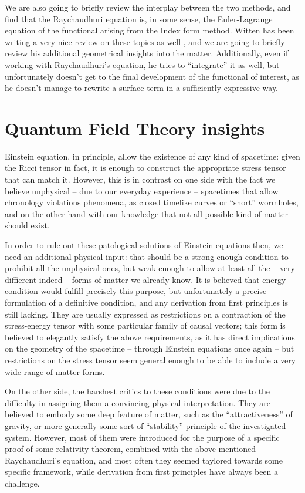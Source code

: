 We are also going to briefly review the interplay between the two methods, and find that the Raychaudhuri equation is, in some sense, the Euler-Lagrange equation of the functional arising from the Index form method. Witten has been writing a very nice review on these topics as well \cite[]{witten2020light}, and we are going to briefly review his additional geometrical insights into the matter. Additionally, even if working with Raychaudhuri's equation, he tries to ``integrate'' it as well, but unfortunately doesn't get to the final development of the functional of interest, as he doesn't manage to rewrite a surface term in a sufficiently expressive way.

\section{Quantum Field Theory insights}
Einstein equation, in principle, allow the existence of any kind of spacetime: given the Ricci tensor in fact, it is enough to construct the appropriate stress tensor that can match it. However, this is in contrast on one side with the fact we believe unphysical -- due to our everyday experience -- spacetimes that allow chronology violations phenomena, as closed timelike curves or ``short'' wormholes, and on the other hand with our knowledge that not all possible kind of matter should exist.

In order to rule out these patological solutions of Einstein equations then, we need an additional physical input: that should be a strong enough condition to prohibit all the unphysical ones, but weak enough to allow at least all the -- very diffierent indeed -- forms of matter we already know.
It is believed that energy condition would fulfill precisely this purpose, but unfortunately a precise formulation of a definitive condition, and any derivation from first principles is still lacking. They are usually expressed as restrictions on a contraction of the stress-energy tensor with some particular family of causal vectors; this form is believed to elegantly satisfy the above requirements, as it has direct implications on the geometry of the spacetime -- through Einstein equations once again -- but restrictions on the stress tensor seem general enough to be able to include a very wide range of matter forms.

On the other side, the harshest critics to these conditions were due to the difficulty in assigning them a convincing physical interpretation. They are believed to embody some deep feature of matter, such as the ``attractiveness'' of gravity, or more generally some sort of ``stability'' principle of the investigated system.
However, most of them were introduced for the purpose of a specific proof of some relativity theorem, combined with the above mentioned Raychaudhuri's equation, and most often they seemed taylored towards some specific framework, while derivation from first principles have always been a challenge.

